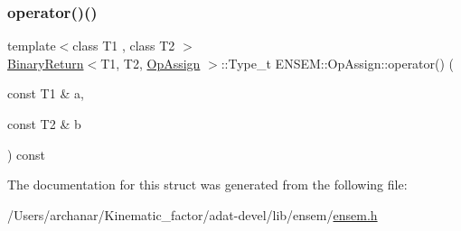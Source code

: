 \subsubsection{\texorpdfstring{operator()()}{operator()()}\hspace{0.1cm}{\footnotesize\ttfamily [3/3]}}
{\footnotesize\ttfamily template$<$class T1 , class T2 $>$ \\
\mbox{\hyperlink{structENSEM_1_1BinaryReturn}{Binary\+Return}}$<$T1, T2, \mbox{\hyperlink{structENSEM_1_1OpAssign}{Op\+Assign}} $>$\+::Type\+\_\+t E\+N\+S\+E\+M\+::\+Op\+Assign\+::operator() (\begin{DoxyParamCaption}\item[{const T1 \&}]{a,  }\item[{const T2 \&}]{b }\end{DoxyParamCaption}) const\hspace{0.3cm}{\ttfamily [inline]}}



The documentation for this struct was generated from the following file\+:\begin{DoxyCompactItemize}
\item 
/\+Users/archanar/\+Kinematic\+\_\+factor/adat-\/devel/lib/ensem/\mbox{\hyperlink{adat-devel_2lib_2ensem_2ensem_8h}{ensem.\+h}}\end{DoxyCompactItemize}
